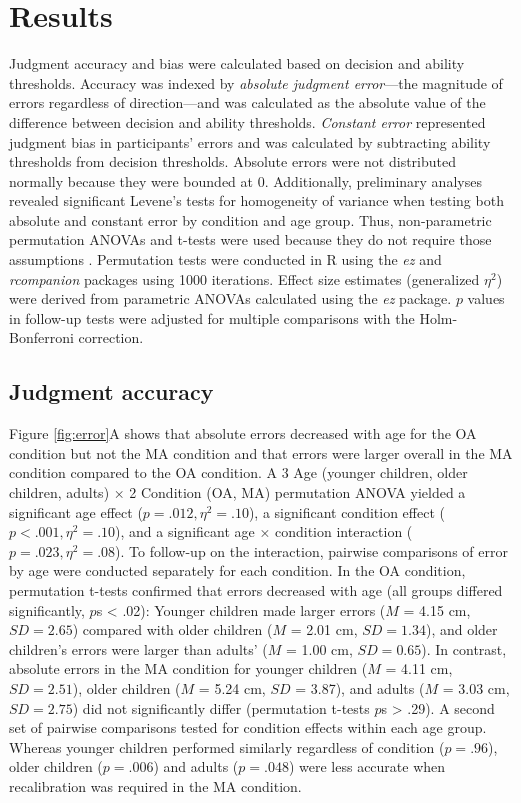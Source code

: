 \documentclass[a4paper,man,natbib,floatsintext,noextraspace]{apa6}
\begin{document}
\section{Results}

Judgment accuracy and bias were calculated based on decision and ability thresholds. Accuracy was indexed by \textit{absolute judgment error}---the magnitude of errors regardless of direction---and was calculated as the absolute value of the difference between decision and ability thresholds. \textit{Constant error} represented judgment bias in participants’ errors and was calculated by subtracting ability thresholds from decision thresholds. Absolute errors were not distributed normally because they were bounded at 0. Additionally, preliminary analyses revealed significant Levene’s tests for homogeneity of variance when testing both absolute and constant error by condition and age group. Thus, non-parametric permutation ANOVAs and t-tests were used because they do not require those assumptions \citep{Edgington}. Permutation tests were conducted in R using the \textit{ez} and \textit{rcompanion} packages using 1000 iterations. Effect size estimates (generalized $\eta^{2}$) were derived from parametric ANOVAs calculated using the \textit{ez} package. $p$ values in follow-up tests were adjusted for multiple comparisons with the Holm-Bonferroni correction.

\subsection{Judgment accuracy}

Figure \ref{fig:error}A shows that absolute errors decreased with age for the OA condition but not the MA condition and that errors were larger overall in the MA condition compared to the OA condition. A 3 Age (younger children, older children, adults) × 2 Condition (OA, MA) permutation ANOVA yielded a significant age effect ($p = .012, \eta^{2} = .10$), a significant condition effect ($p < .001, \eta^{2} = .10$), and a significant age × condition interaction ($p = .023, \eta^{2} = .08$). To follow-up on the interaction, pairwise comparisons of error by age were conducted separately for each condition. In the OA condition, permutation t-tests confirmed that errors decreased with age (all groups differed significantly, $p$s < .02): Younger children made larger errors ($M$ = 4.15 cm, $SD = 2.65$) compared with older children ($M$ = 2.01 cm, $SD = 1.34$), and older children's errors were larger than adults' ($M$ = 1.00 cm, $SD = 0.65$). In contrast, absolute errors in the MA condition for younger children ($M$ = 4.11 cm, $SD = 2.51$), older children ($M$ = 5.24 cm, $SD$ = 3.87), and adults ($M$ = 3.03 cm, $SD = 2.75$) did not significantly differ (permutation t-tests $p$s > .29). A second set of pairwise comparisons tested for condition effects within each age group. Whereas younger children performed similarly regardless of condition ($p = .96$), older children ($p = .006$) and adults ($p = .048$) were less accurate when recalibration was required in the MA condition.
\end{document}
